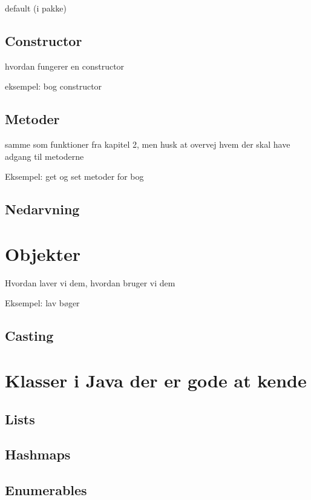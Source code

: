 default (i pakke)

\subsection{Constructor}

hvordan fungerer en constructor

eksempel: bog constructor

\subsection{Metoder}

samme som funktioner fra kapitel 2, men husk at overvej hvem der skal have adgang til metoderne

Eksempel: get og set metoder for bog

\subsection{Nedarvning}

\section{Objekter}

Hvordan laver vi dem, hvordan bruger vi dem

Eksempel: lav bøger

\subsection{Casting}

\section{Klasser i Java der er gode at kende}

\subsection{Lists}

\subsection{Hashmaps}

\subsection{Enumerables}


